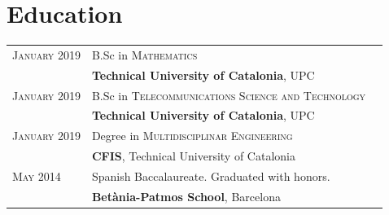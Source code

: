 \documentclass[a4paper,10pt]{article} %
\begin{document}
\section{Education}

\begin{table}[h!]
\begin{tabular}{R{3cm}L{9.5cm}C{3cm}}	
\textsc{January} 2019 & B.Sc in \textsc{Mathematics} &  \\[3pt] & \textbf{Technical University of Catalonia}, UPC & \\[7pt]

\textsc{January} 2019 &  B.Sc in \textsc{Telecommunications Science and Technology}&   \\[3pt] & \textbf{Technical University of Catalonia}, UPC&  \\[7pt]

\textsc{January} 2019 &  Degree in \textsc{Multidisciplinar Engineering} &   \\[3pt] & \textbf{CFIS}, Technical University of Catalonia\\[7pt]

\textsc{May} 2014 & Spanish Baccalaureate. Graduated with honors.  &  \\[3pt] & \textbf{Betània-Patmos School}, Barcelona & \\[3pt]\end{tabular}
\end{table}
\end{document}
